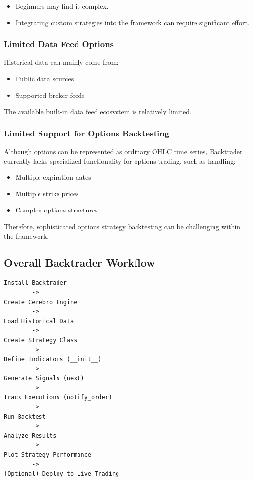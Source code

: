\documentclass[12pt,openany]{book}
\begin{document}
\begin{itemize}[leftmargin=*]
    \item Beginners may find it complex.
    \item Integrating custom strategies into the framework can require significant effort.
\end{itemize}

\subsubsection{Limited Data Feed Options}

Historical data can mainly come from:

\begin{itemize}[leftmargin=*]
    \item Public data sources
    \item Supported broker feeds
\end{itemize}

The available built-in data feed ecosystem is relatively limited.

\subsubsection{Limited Support for Options Backtesting}

Although options can be represented as ordinary OHLC time series, Backtrader currently lacks specialized functionality for options trading, such as handling:

\begin{itemize}[leftmargin=*]
    \item Multiple expiration dates
    \item Multiple strike prices
    \item Complex options structures
\end{itemize}

Therefore, sophisticated options strategy backtesting can be challenging within the framework.

\subsection{Overall Backtrader Workflow}

\begin{Verbatim}[breaklines=true,breakanywhere=true,fontsize=\small]
Install Backtrader
        ->
Create Cerebro Engine
        ->
Load Historical Data
        ->
Create Strategy Class
        ->
Define Indicators (__init__)
        ->
Generate Signals (next)
        ->
Track Executions (notify_order)
        ->
Run Backtest
        ->
Analyze Results
        ->
Plot Strategy Performance
        ->
(Optional) Deploy to Live Trading
\end{Verbatim}
\end{document}
